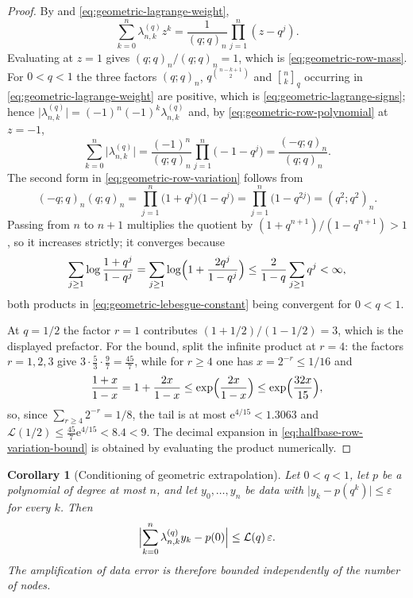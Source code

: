 \documentclass[11pt,oneside,openany]{book}
\newtheorem{corollary}[corollary]{Corollary}
\theoremstyle{definition}
\theoremstyle{remark}
\newcommand{\qbinom}[2]{\genfrac{[}{]}{0pt}{}{#1}{#2}_{q}}
\newcommand{\poch}[3]{(#1;#2)_{#3}}
\newcommand{\eps}{\varepsilon}
\newcommand{\e}{\mathrm e}
\newcommand{\abs}[1]{\lvert #1\rvert}
\begin{document}
\begin{proof}
By  and \eqref{eq:geometric-lagrange-weight},
\begin{equation}\label{eq:geometric-row-polynomial}
 \sum_{k=0}^{n}\lambda_{n,k}^{(q)}z^k
 =\frac1{(q;q)_n}\prod_{j=1}^{n}(z-q^j).
\end{equation}
Evaluating at $z=1$ gives $(q;q)_n/(q;q)_n=1$, which is
\eqref{eq:geometric-row-mass}.  For $0<q<1$ the three factors $\poch{q}{q}{n}$,
$q^{\binom{n-k+1}{2}}$ and $\qbinom nk$ occurring in
\eqref{eq:geometric-lagrange-weight} are positive, which is
\eqref{eq:geometric-lagrange-signs}; hence
$\bigl|\lambda_{n,k}^{(q)}\bigr|=(-1)^{n}(-1)^{k}\lambda_{n,k}^{(q)}$ and, by
\eqref{eq:geometric-row-polynomial} at $z=-1$,
\[
 \sum_{k=0}^{n}\bigl|\lambda_{n,k}^{(q)}\bigr|
 =\frac{(-1)^n}{(q;q)_n}\prod_{j=1}^{n}\bigl(-1-q^j\bigr)
 =\frac{\poch{-q}{q}{n}}{\poch{q}{q}{n}} .
\]
The second form in \eqref{eq:geometric-row-variation} follows from
\[
 \poch{-q}{q}{n}\poch{q}{q}{n}
 =\prod_{j=1}^{n}\bigl(1+q^j\bigr)\bigl(1-q^j\bigr)
 =\prod_{j=1}^{n}\bigl(1-q^{2j}\bigr)=\poch{q^2}{q^2}{n}.
\]
Passing from $n$ to $n+1$ multiplies the quotient by $(1+q^{n+1})/(1-q^{n+1})>1$, so it
increases strictly; it converges because
\[
 \sum_{j\ge1}\log\frac{1+q^j}{1-q^j}
 =\sum_{j\ge1}\log\Bigl(1+\frac{2q^j}{1-q^j}\Bigr)
 \le\frac2{1-q}\sum_{j\ge1}q^j<\infty,
\]
both products in \eqref{eq:geometric-lebesgue-constant} being convergent for $0<q<1$.

At $q=1/2$ the factor $r=1$ contributes $(1+1/2)/(1-1/2)=3$, which is the displayed
prefactor.  For the bound, split the infinite product at $r=4$: the factors $r=1,2,3$ give
$3\cdot\frac53\cdot\frac97=\frac{45}7$, while for $r\ge4$ one has $x=2^{-r}\le1/16$ and
\[
 \frac{1+x}{1-x}=1+\frac{2x}{1-x}\le\exp\Bigl(\frac{2x}{1-x}\Bigr)
 \le\exp\Bigl(\frac{32x}{15}\Bigr),
\]
so, since $\sum_{r\ge4}2^{-r}=1/8$, the tail is at most $\e^{4/15}<1.3063$ and
$\mathcal L(1/2)\le\frac{45}7\e^{4/15}<8.4<9$.  The decimal expansion in
\eqref{eq:halfbase-row-variation-bound} is obtained by evaluating the product
numerically.
\end{proof}

\begin{corollary}[Conditioning of geometric extrapolation]\label{cor:geometric-extrapolation-conditioning}
Let $0<q<1$, let $p$ be a polynomial of degree at most $n$, and let $y_0,\ldots,y_n$ be
data with $\abs{y_k-p(q^k)}\le\eps$ for every $k$.  Then
\begin{equation}\label{eq:geometric-extrapolation-conditioning}
 \Bigl|\sum_{k=0}^{n}\lambda^{(q)}_{n,k}y_k-p(0)\Bigr|\le\mathcal L(q)\,\eps .
\end{equation}
The amplification of data error is therefore bounded independently of the number of
nodes.
\end{corollary}
\end{document}
